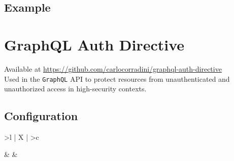 \subsection{Example}
\label{subsec:projects_inline_example}

\section{GraphQL Auth Directive}
\label{sec:projects_graphql_auth_diretive}

Available at \url{https://github.com/carlocorradini/graphql-auth-directive} \\ %
Used in the \texttt{GraphQL} API to protect resources from unauthenticated and
unauthorized access in high-security contexts. \\ %

\subsection{Configuration}
\label{subsec:projects_graphql_auth_diretive_configuration}

\begin{xltabular}
  {\textwidth} { >{\ttfamily}l | X | >{\ttfamily}c }

   &
   &
   \\ \hline \hline
  \caption{TODO}
\end{xltabular}